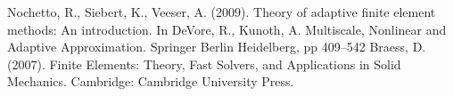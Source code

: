 \begin{thebibliography}{56}
	Nochetto, R., Siebert, K., Veeser, A. (2009). Theory of adaptive finite element methods: An introduction. In DeVore, R., Kunoth, A. Multiscale, Nonlinear and Adaptive Approximation. Springer Berlin Heidelberg, pp 409--542
	Braess, D. (2007). Finite Elements: Theory, Fast Solvers, and Applications in Solid Mechanics. Cambridge: Cambridge University Press.
\end{thebibliography}


